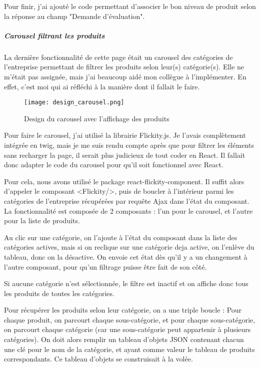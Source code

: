 Pour finir, j'ai ajouté le code permettant d'associer le bon niveau de produit selon la réponse au champ "Demande d'évaluation".

\subparagraph{Carousel filtrant les produits}

La dernière fonctionnalité de cette page était un carousel des catégories de l'entreprise permettant de filtrer les produits selon leur(s) catégorie(s).
Elle ne m'était pas assignée, mais j'ai beaucoup aidé mon collègue à l'implémenter. En effet, c'est moi qui ai réfléchi à la manière dont il fallait le faire.

\begin{figure}[H]
    \texttt{[image: design\_carousel.png]}
    \caption{Design du carousel avec l'affichage des produits}
\end{figure}

Pour faire le carousel, j'ai utilisé la librairie Flickity.js. 
Je l'avais complètement intégrée en twig, mais je me suis rendu compte après que pour filtrer les éléments sans recharger la page, il serait plus judicieux de tout coder en React.
Il fallait donc adapter le code du carousel pour qu'il soit fonctionnel avec React.

Pour cela, nous avons utilisé le package react-flickity-component. Il suffit alors d'appeler le composant <Flickity/>, puis de boucler à l'intérieur parmi les catégories de l'entreprise récupérées par requête Ajax dans l'état du composant.\\

La fonctionnalité est composée de 2 composants : l'un pour le carousel, et l'autre pour la liste de produits.

Au clic sur une catégorie, on l'ajoute à l'état du composant dans la liste des catégories actives, mais si on reclique sur une catégorie deja active, on l'enlève du tableau, donc on la désactive. On envoie cet état dès qu'il y a un changement à l'autre composant, pour qu'un filtrage puisse être fait de son côté.

Si aucune catégorie n'est sélectionnée, le filtre est inactif et on affiche donc tous les produits de toutes les catégories.

Pour récupérer les produits selon leur catégorie, on a une triple boucle : Pour chaque produit, on parcourt chaque sous-catégorie, et pour chaque sous-catégorie, on parcourt chaque catégorie (car une sous-catégorie peut appartenir à plusieurs catégories).
On doit alors remplir un tableau d'objets JSON contenant chacun une clé pour le nom de la catégorie, et ayant comme valeur le tableau de produits correspondants. Ce tableau d'objets se construisait à la volée.

